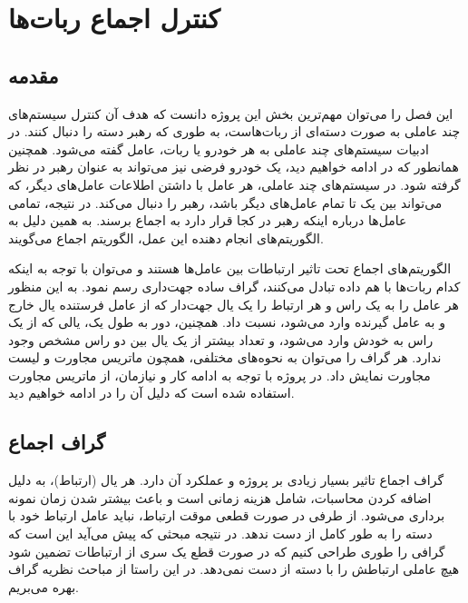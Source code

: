 \chapter{کنترل اجماع ربات‌‌ها}

\section{مقدمه}
این فصل را می‌توان مهم‌ترین بخش این پروژه دانست که هدف آن کنترل سیستم‌های چند عاملی به صورت دسته‌ای از ربات‌هاست، به طوری که رهبر دسته را دنبال کنند. در ادبیات سیستم‌های چند عاملی به هر خودرو یا ربات، عامل گفته می‌شود. همچنین همانطور که در ادامه خواهیم دید، یک خودرو فرضی نیز می‌تواند به عنوان رهبر در نظر گرفته شود. در سیستم‌های چند عاملی، هر عامل با داشتن اطلاعات عامل‌های دیگر، که می‌تواند بین یک تا تمام عامل‌های دیگر باشد، رهبر را دنبال می‌کند. در نتیجه، تمامی عامل‌ها درباره اینکه رهبر در کجا قرار دارد به اجماع برسند. به همین دلیل به الگوریتم‌های انجام دهنده این عمل، الگوریتم اجماع می‌گویند.

الگوریتم‌های اجماع تحت تاثیر ارتباطات بین عامل‌ها هستند و می‌توان با توجه به اینکه کدام ربات‌ها با هم داده تبادل می‌کنند، گراف ساده جهت‌داری رسم نمود. به این منظور هر عامل را به یک راس و هر ارتباط را یک یال جهت‌دار که از عامل فرستنده یال خارج و به عامل گیرنده وارد می‌شود، نسبت داد. همچنین، دور به طول‌ یک، یالی که از یک راس به خودش وارد می‌شود، و تعداد بیشتر از یک یال بین دو راس مشخص وجود ندارد. هر گراف را می‌توان به نحوه‌های مختلفی، همچون ماتریس مجاورت و لیست مجاورت نمایش داد. در پروژه با توجه به ادامه کار و نیازمان، از ماتریس مجاورت استفاده شده است که دلیل آن را در ادامه خواهیم دید.

\section{گراف اجماع}
گراف اجماع تاثیر بسیار زیادی بر پروژه و عملکرد آن دارد. هر یال (ارتباط)، به دلیل اضافه کردن محاسبات، شامل هزینه زمانی است و باعث بیشتر شدن زمان نمونه برداری می‌شود. از طرفی در صورت قطعی موقت ارتباط، نباید عامل ارتباط خود با دسته را به طور کامل از دست ندهد. در نتیجه مبحثی که پیش می‌آید این است که گرافی را طوری طراحی کنیم که در صورت قطع یک سری از ارتباطات تضمین شود هیچ عاملی ارتباطش را با دسته از دست نمی‌دهد. در این راستا از مباحث نظریه گراف بهره می‌بریم.

